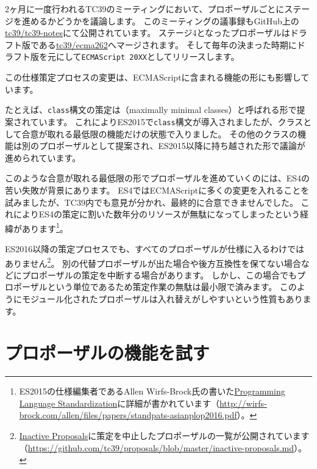 2ヶ月に一度行われるTC39のミーティングにおいて、プロポーザルごとにステージを進めるかどうかを議論します。
このミーティングの議事録もGitHub上の\href{https://github.com/tc39/tc39-notes}{tc39/tc39-notes}にて公開されています。
ステージ4となったプロポーザルはドラフト版である\href{https://github.com/tc39/ecma262}{tc39/ecma262}へマージされます。
そして毎年の決まった時期にドラフト版を元にして\texttt{ECMAScript 20XX}としてリリースします。

この仕様策定プロセスの変更は、ECMAScriptに含まれる機能の形にも影響しています。

たとえば、\texttt{class}構文の策定は\textbf{}（maximally
minimal classes）と呼ばれる形で提案されています。
これによりES2015で\texttt{class}構文が導入されましたが、クラスとして合意が取れる最低限の機能だけの状態で入りました。
その他のクラスの機能は別のプロポーザルとして提案され、ES2015以降に持ち越された形で議論が進められています。

このような合意が取れる最低限の形でプロポーザルを進めていくのには、ES4の苦い失敗が背景にあります。
ES4ではECMAScriptに多くの変更を入れることを試みましたが、TC39内でも意見が分かれ、最終的に合意できませんでした。
これによりES4の策定に割いた数年分のリソースが無駄になってしまったという経緯があります\footnote{ES2015の仕様編集者であるAllen
  Wirfs-Brock氏の書いた\href{http://wirfs-brock.com/allen/files/papers/standpats-asianplop2016.pdf}{Programming
  Language Standardization}に詳細が書かれています（\url{http://wirfs-brock.com/allen/files/papers/standpats-asianplop2016.pdf}）。}。

ES2016以降の策定プロセスでも、すべてのプロポーザルが仕様に入るわけではありません\footnote{\href{https://github.com/tc39/proposals/blob/master/inactive-proposals.md}{Inactive
  Proposals}に策定を中止したプロポーザルの一覧が公開されています（\url{https://github.com/tc39/proposals/blob/master/inactive-proposals.md}）。}。
別の代替プロポーザルが出た場合や後方互換性を保てない場合などにプロポーザルの策定を中断する場合があります。
しかし、この場合でもプロポーザルという単位であるため策定作業の無駄は最小限で済みます。
このようにモジュール化されたプロポーザルは入れ替えがしやすいという性質もあります。

\hypertarget{try-proposal}{%
\section{プロポーザルの機能を試す}\label{try-proposal}}

